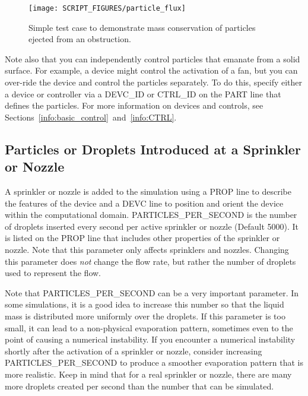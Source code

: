 \documentclass[11pt]{book}
\begin{document}
\begin{figure}[ht]
\begin{center}
\texttt{[image: SCRIPT\_FIGURES/particle\_flux]}
\end{center}
\caption[Results of the {\ct particle\_flux} test case]{Simple test case to demonstrate mass conservation of particles ejected from an obstruction.}
\label{particle_flux_fig}
\end{figure}

Note also that you can independently control particles that emanate from a solid surface. For example, a device might control the activation of a fan, but you can over-ride the device and control the particles separately. To do this, specify either a device or controller via a {\ct DEVC\_ID} or {\ct CTRL\_ID} on the {\ct PART} line that defines the particles. For more information on devices and controls, see Sections~\ref{info:basic_control}~and~\ref{info:CTRL}.


\subsection{Particles or Droplets Introduced at a Sprinkler or Nozzle}
\label{info:sprinkler_droplets}

A sprinkler or nozzle is added to the simulation using a {\ct PROP} line to describe the features of the device and a {\ct DEVC} line to position and orient the device within the computational domain. {\ct PARTICLES\_PER\_SECOND} is the  number of droplets inserted every second per active sprinkler or nozzle (Default 5000). It is listed on the {\ct PROP} line that includes other properties of the sprinkler or nozzle. Note that this parameter only affects sprinklers and nozzles. Changing this parameter does {\em not} change the flow rate, but rather the number of droplets used to represent the flow.

Note that {\ct PARTICLES\_PER\_SECOND} can be a very important parameter. In some simulations, it is a good idea to increase this number so that the liquid mass is distributed more uniformly over the droplets. If this parameter is too small, it can lead to a non-physical evaporation pattern, sometimes even to the point of causing a numerical instability. If you encounter a numerical instability shortly after the activation of a sprinkler or nozzle, consider increasing {\ct PARTICLES\_PER\_SECOND} to produce a smoother evaporation pattern that is more realistic. Keep in mind that for a real sprinkler or nozzle, there are many more droplets created per second than the number that can be simulated.
\end{document}
